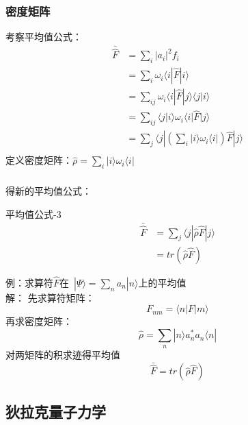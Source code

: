 \begin{frame}
    \frametitle{密度矩阵}
    考察平均值公式：\\
    $$ \begin{aligned}
    \bar{\hat{F}} &=\sum\limits_i |a_i|^2 f_i \\
            &=\sum\limits_i \omega_i \langle i |\hat{F}|i \rangle  \\
            &=\sum\limits_{ij} \omega_i \langle i |\hat{F} |j\rangle \langle j| i\rangle  \\
            &=\sum\limits_{ij} \langle j| i\rangle  \omega_i \langle i |\hat{F} |j\rangle  \\
            &=\sum\limits_{j} \langle j | (\sum\limits_{i}| i \rangle  \omega_i \langle i |) \hat{F} |j\rangle  \\
    \end{aligned} $$
    定义密度矩阵：$ \hat{\rho} = \sum\limits_{i}| i \rangle  \omega_i \langle i | $
\end{frame} 
 
\begin{frame}  
    \frametitle{}  得新的平均值公式：
    \begin{tcolorbox1}{平均值公式-3}
         $$ \begin{aligned}
            \bar{\hat{F}}&=\sum\limits_{j} \langle j | \hat{\rho} \hat{F} |j\rangle \\
                &=tr (\hat{\rho} \hat{F} )
        \end{aligned} $$   
    \end{tcolorbox1} 
\end{frame} 
 
\begin{frame}      
    例：求算符$\hat{F}$在 $|\Psi\rangle =\sum\limits_n a_n |n\rangle $上的平均值 \\
    \alert{解：} 先求算符矩阵：
    $$ F_{nm} = \langle n | F |m \rangle  $$
    再求密度矩阵：
    $$ \hat{\rho} = \sum\limits_{n}| n \rangle  a_n ^* a_n \langle n | $$
    对两矩阵的积求迹得平均值
    $$\bar{\hat{F}}=tr (\hat{\rho} \hat{F} )$$
\end{frame} 
 
\subsection{狄拉克量子力学}

